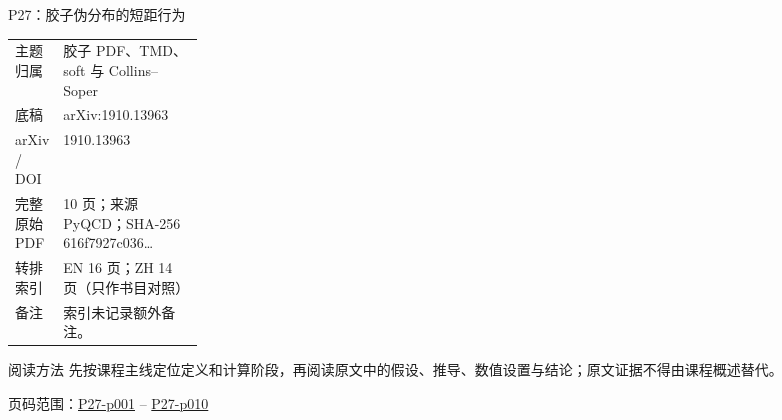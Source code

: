 \documentclass[aspectratio=169,10pt]{ctexbeamer}
\begin{document}
\begin{frame}[t]{P27：胶子伪分布的短距行为}
\small\begin{tabularx}{\linewidth}{p{0.22\linewidth}Y}
\toprule 主题归属 & 胶子 PDF、TMD、soft 与 Collins--Soper\\
底稿 & arXiv:1910.13963\\
arXiv / DOI & 1910.13963\\
完整原始 PDF & 10 页；来源 PyQCD；SHA-256 616f7927c036\ldots\\
转排索引 & EN 16 页；ZH 14 页（只作书目对照）\\
备注 & 索引未记录额外备注。\\
\bottomrule\end{tabularx}\vspace{0.25cm}
\begin{block}{阅读方法}
先按课程主线定位定义和计算阶段，再阅读原文中的假设、推导、数值设置与结论；原文证据不得由课程概述替代。
\end{block}
\vfill 页码范围：\hyperlink{P27-p001}{P27-p001} -- \hyperlink{P27-p010}{P27-p010}
\end{frame}
\end{document}
